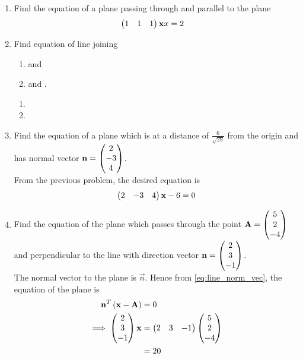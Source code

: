\documentclass[journal,12pt,twocolumn]{IEEEtran}
\renewcommand\thesection{\arabic{section}}
\begin{document}
\begin{enumerate}[label=\thesection.\arabic*.,ref=\thesection.\theenumi]
\item Find the equation of a plane passing through  and parallel to the plane 
%
\begin{align}
\begin{pmatrix}1 & 1 & 1\end{pmatrix}\mathbf{x}{x}&=2
\end{align}
%
\item Find equation of line joining
\begin{enumerate}
\item  {} and  
\item {} and .
\end{enumerate}
\solution
\begin{enumerate}
    \item %
    \item %
    
\end{enumerate}
\item Find the equation of a plane which is at a distance of $\frac{6}{\sqrt{29}}$ from the origin and has  normal vector $\mathbf{n}=\begin{pmatrix}2\\-3\\4\end{pmatrix}$.
%
\\
\solution From the previous problem, the desired equation is
%
\begin{align}
\begin{pmatrix}2 & -3 & 4\end{pmatrix}\mathbf{x}-6  = 0
\end{align}
%

\item Find the equation of the plane which passes through the point $\mathbf{A}=\begin{pmatrix}5\\2\\-4\end{pmatrix}$ and perpendicular to the line with direction vector $\mathbf{n}=\begin{pmatrix}2\\3\\-1\end{pmatrix}$.
%
\\
\solution  The normal vector to the plane is $\vec{n}$. Hence from \eqref{eq:line_norm_vec}, the equation of the plane is 
%
\begin{align}
\mathbf{n}^T\left(\mathbf{x}-\mathbf{A}\right) &= 0
\\
\implies \begin{pmatrix}2\\3\\-1\end{pmatrix}\mathbf{x} &=\begin{pmatrix}2&3&-1\end{pmatrix}\begin{pmatrix}5\\2\\-4\end{pmatrix}
\\
&=20
\end{align}
%
%


\end{enumerate}
\end{document}

